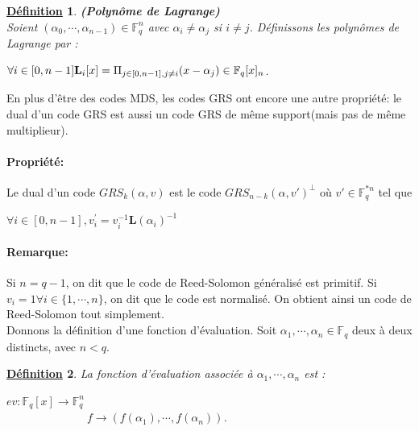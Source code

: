 \documentclass[12pt,openany]{report}
\newtheorem{definition}{\underline{Définition}}
\begin{document}
  \begin{definition} \textbf{(Polynôme de Lagrange)}\\
   Soient $(\alpha_0,\cdots,\alpha_{n-1})\in \mathbb{F}_q^n $
   avec $\alpha_i \neq \alpha_j $ si $ i \neq j$. Définissons les polynômes de Lagrange par :\\
   
   \begin{center}
   $ \forall i \in [0, n-1] \mathbf{L}_i[x]={\Huge \Pi}_{j \in [0, n-1], j \neq i }(x-\alpha_j) \in \mathbb{F}_q[x]_n $.
 
   
   \end{center}
     \end{definition}
    En plus d'être des codes MDS, les codes GRS ont encore une autre propriété: le dual d'un code GRS est aussi un code GRS de même support(mais pas de même multiplieur).\\
    \paragraph{Propriété:\\}
    Le dual d'un code $GRS_k(\alpha,v)$ est le code $GRS_{n-k}(\alpha,v')^{\perp} $ où $v' \in \mathbb{F}_q^{*n} $ tel que\\
    
    \begin{center}
    $ \forall i \in [0, n-1], v_i^{'}= v_i^{-1} \mathbf{L}(\alpha_i)^{-1}$
    \end{center}
    \paragraph{Remarque: \\}
    Si $ n=q-1 $, on dit que le code de Reed-Solomon généralisé est primitif.
    Si $ v_i =1 \forall i \in \lbrace 1, \cdots,n \rbrace $, on dit que le code est normalisé. On obtient ainsi un code de Reed-Solomon tout simplement.\\
    Donnons la définition d'une fonction d'évaluation. Soit $\alpha_1,\cdots,\alpha_n \in \mathbb{F}_q $ deux à deux distincts, avec $n<q $.
    \begin{definition}
    La fonction d'évaluation associée à $\alpha_1,\cdots,\alpha_n  $ est : 
    \begin{center}
     
      $ ev:\mathbb{F}_q[x]\longrightarrow \mathbb{F}_q^n $\\
       $ \hspace{3cm} f    \longrightarrow \left(  f(\alpha_1),\cdots,f(\alpha_n)  \right)$.   
    
    \end{center}
    \end{definition}
    
\end{document}
